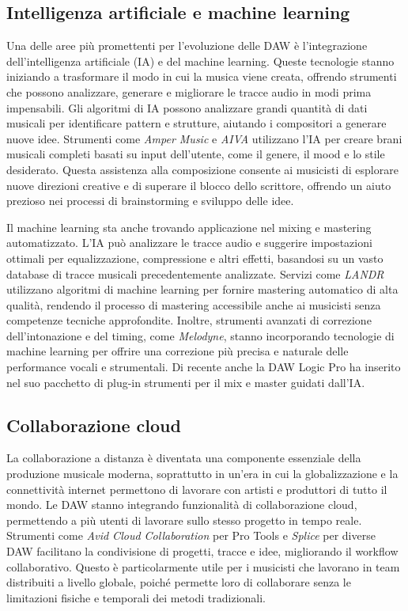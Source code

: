 \documentclass{book}
\begin{document}
\subsection{Intelligenza artificiale e machine learning}

Una delle aree più promettenti per l’evoluzione delle DAW è l’integrazione dell’intelligenza artificiale (IA) e del machine learning. Queste tecnologie stanno iniziando a trasformare il modo in cui la musica viene creata, offrendo strumenti che possono analizzare, generare e migliorare le tracce audio in modi prima impensabili. Gli algoritmi di IA possono analizzare grandi quantità di dati musicali per identificare pattern e strutture, aiutando i compositori a generare nuove idee. Strumenti come \textit{Amper Music} e \textit{AIVA} utilizzano l’IA per creare brani musicali completi basati su input dell’utente, come il genere, il mood e lo stile desiderato. Questa assistenza alla composizione consente ai musicisti di esplorare nuove direzioni creative e di superare il blocco dello scrittore, offrendo un aiuto prezioso nei processi di brainstorming e sviluppo delle idee.

Il machine learning sta anche trovando applicazione nel mixing e mastering automatizzato. L’IA può analizzare le tracce audio e suggerire impostazioni ottimali per equalizzazione, compressione e altri effetti, basandosi su un vasto database di tracce musicali precedentemente analizzate. Servizi come \textit{LANDR} utilizzano algoritmi di machine learning per fornire mastering automatico di alta qualità, rendendo il processo di mastering accessibile anche ai musicisti senza competenze tecniche approfondite. Inoltre, strumenti avanzati di correzione dell’intonazione e del timing, come \textit{Melodyne}, stanno incorporando tecnologie di machine learning per offrire una correzione più precisa e naturale delle performance vocali e strumentali. Di recente anche la DAW Logic Pro ha inserito nel suo pacchetto di plug-in strumenti per il mix e master guidati dall’IA.

\subsection{Collaborazione cloud}

La collaborazione a distanza è diventata una componente essenziale della produzione musicale moderna, soprattutto in un’era in cui la globalizzazione e la connettività internet permettono di lavorare con artisti e produttori di tutto il mondo. Le DAW stanno integrando funzionalità di collaborazione cloud, permettendo a più utenti di lavorare sullo stesso progetto in tempo reale. Strumenti come \textit{Avid Cloud Collaboration} per Pro Tools e \textit{Splice} per diverse DAW facilitano la condivisione di progetti, tracce e idee, migliorando il workflow collaborativo. Questo è particolarmente utile per i musicisti che lavorano in team distribuiti a livello globale, poiché permette loro di collaborare senza le limitazioni fisiche e temporali dei metodi tradizionali.
\end{document}
